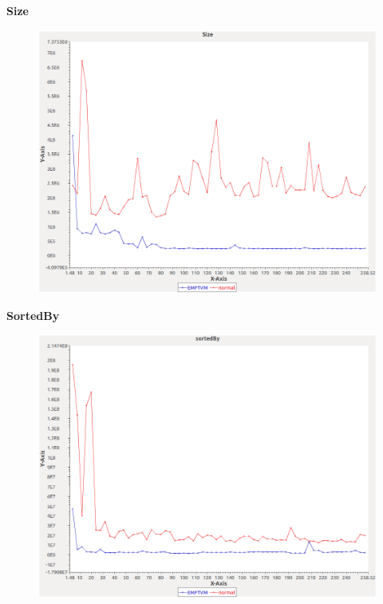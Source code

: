 \noindent\textbf{Size}

\begin{figure}[h]
\centering
\includegraphics[width=\textwidth]{../graphs/sequence/Size}
\end{figure}
\pagebreak

\noindent\textbf{SortedBy}

\begin{figure}[h]
\centering
\includegraphics[width=\textwidth]{../graphs/sequence/sortedBy}
\end{figure}
\pagebreak

